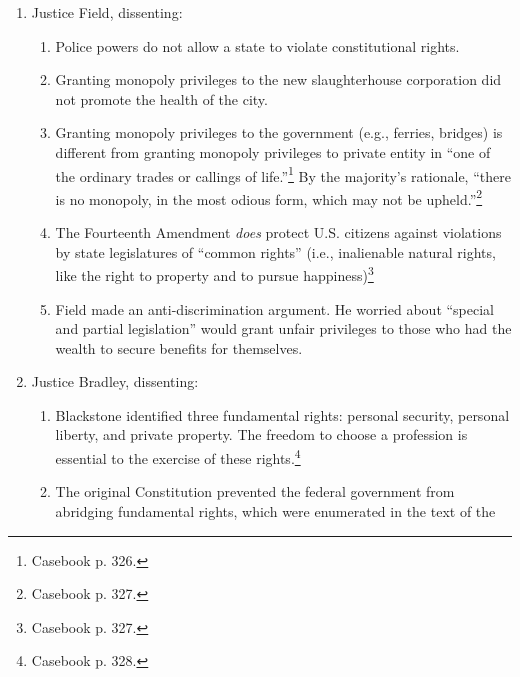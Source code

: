 \begin{enumerate}
\begin{enumerate}
        \item \textbf{Butchers' Argument 4}: the statute denied equal protection.
        \begin{enumerate}
            \item No. The equal protection clause applies only to 
            slavery.\footnote{Casebook p. 326.}
        \end{enumerate}
    \end{enumerate}
    \item Justice Field, dissenting:
    \begin{enumerate}
        \item Police powers do not allow a state to violate constitutional 
        rights.
        \item Granting monopoly privileges to the new slaughterhouse 
        corporation did not promote the health of the city.
        \item Granting monopoly privileges to the government (e.g., ferries, 
        bridges) is different from granting monopoly privileges to private 
        entity in ``one of the ordinary trades or callings of 
        life.''\footnote{Casebook p. 326.} By the majority's rationale, 
        ``there is no monopoly, in the most odious form, which may not be 
        upheld.''\footnote{Casebook p. 327.}
        \item The Fourteenth Amendment \emph{does} protect U.S. citizens 
        against violations by state legislatures of ``common 
        rights'' (i.e., inalienable natural rights, like the right to property 
        and to pursue happiness)\footnote{Casebook p. 327.}
        \item Field made an anti-discrimination argument. He worried about 
        ``special and partial legislation'' would grant unfair privileges to 
        those who had the wealth to secure benefits for themselves.
    \end{enumerate}
    \item Justice Bradley, dissenting:
    \begin{enumerate}
        \item Blackstone identified three fundamental rights: personal 
        security, personal liberty, and private property. The freedom to 
        choose a profession is essential to the exercise of these 
        rights.\footnote{Casebook p. 328.}
        \item The original Constitution prevented the federal government from 
        abridging fundamental rights, which were enumerated in the text of the 

\end{enumerate}
\end{enumerate}
